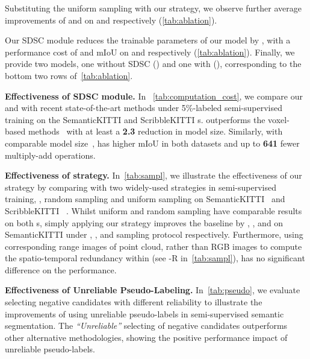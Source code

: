 \documentclass[10pt,twocolumn,letterpaper]{article}
\newcommand\bdtitle[1]{\noindent\textbf{#1}}
\begin{document}
Substituting the uniform sampling with our {\samplshort} strategy, we observe further average improvements of  and  on  and  respectively (\cref{tab:ablation}).

Our SDSC module reduces the trainable parameters of our model by , with a performance cost of  and  mIoU on  and  respectively (\cref{tab:ablation}). Finally, we provide two models, one without SDSC ({\ourmodel}) and one with ({\ourmodelsdsc}), corresponding to the bottom two rows of~\cref{tab:ablation}.

\bdtitle{Effectiveness of SDSC module.} In ~\cref{tab:computation_cost}, we compare our {\ourmodel} and {\ourmodelsdsc} with recent state-of-the-art methods under 5\%-labeled semi-supervised training on the SemanticKITTI and ScribbleKITTI {\validset}s. {\ourmodelsdsc} outperforms the voxel-based methods~\cite{zhu2021cylindrical,Unal_2022_CVPR} with at least a \textbf{2.3} reduction in model size. Similarly, with comparable model size~\cite{choy20194d,tang2020searching,yan20222dpass}, {\ourmodelsdsc} has higher mIoU in both datasets and up to \textbf{641} fewer multiply-add operations.



\bdtitle{Effectiveness of {\samplshort} strategy.} In~\cref{tab:sampl}, we illustrate the effectiveness of our {\samplshort} strategy by comparing  {\ourmodel} with two widely-used strategies in semi-supervised training, \ie, random sampling and uniform sampling on SemanticKITTI~\cite{behley2019semantickittia} and ScribbleKITTI~\cite{Unal_2022_CVPR} {\validset}. Whilst uniform and random sampling have comparable results on both {\validset}s, simply applying our {\samplshort} strategy improves the baseline by , ,  and  on SemanticKITTI under , ,  and  sampling protocol respectively.
Furthermore, using corresponding range images of point cloud, rather than RGB images to compute the spatio-temporal redundancy within {\samplshort} (see {\samplshort}-R in~\cref{tab:sampl}), has no significant difference on the performance.



\bdtitle{Effectiveness of Unreliable Pseudo-Labeling.} In~\cref{tab:pseudo}, we evaluate selecting negative candidates with different reliability to illustrate the improvements of using unreliable pseudo-labels in semi-supervised semantic segmentation. The \textit{“Unreliable”} selecting of negative candidates outperforms other alternative methodologies, showing the positive performance impact of unreliable pseudo-labels.
\end{document}
